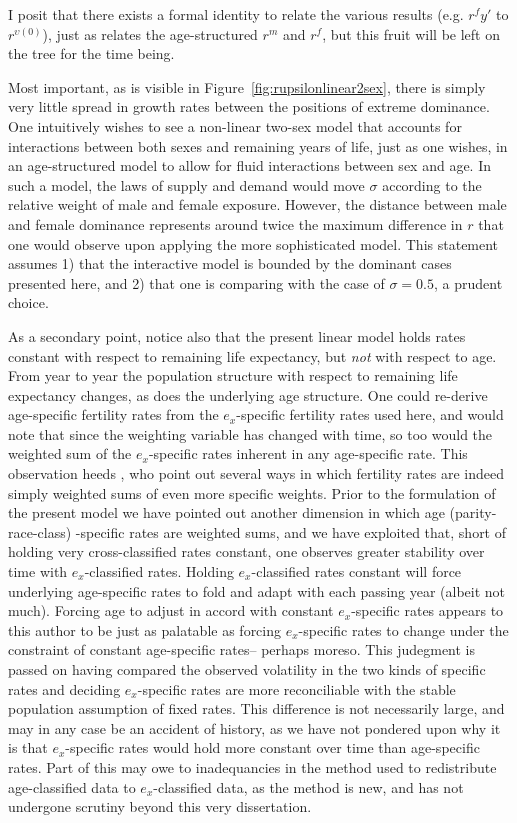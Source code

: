  \FloatBarrier
I posit that there exists a formal identity to relate the various results
(e.g. $r^f{y'}$ to $r^{\upsilon (0)}$), just as \citet[pp. 56]{coale1972growth} relates 
the age-structured $r^m$ and $r^f$, but this fruit will be left on the tree
for the time being.

Most important, as is visible in Figure~\ref{fig:rupsilonlinear2sex}, there is
simply very little spread in growth rates between the positions of extreme
dominance. One intuitively wishes to see a non-linear two-sex model that
accounts for interactions between both sexes and remaining years of life, just
as one wishes, in an age-structured model to allow for fluid interactions
between sex and age. In such a model, the laws of supply and demand would move
$\sigma$ according to the relative weight of male and female exposure. However,
the distance between male and female dominance represents around twice the
maximum difference in $r$ that one would observe upon applying the more
sophisticated model. This statement assumes 1) that the interactive model is
bounded by the dominant cases presented here, and 2) that one is comparing with
the case of $\sigma = 0.5$, a prudent choice. 

As a secondary point, notice also that the present linear model holds rates
constant with respect to remaining life expectancy, but \textit{not} with
respect to age. From year to year the population structure with
respect to remaining life expectancy changes, as does the underlying age
structure. One could re-derive age-specific fertility rates from the
$e_x$-specific fertility rates used here, and would note that since the
weighting variable has changed with time, so too would the weighted sum of
the $e_x$-specific rates inherent in any age-specific rate. This observation
heeds \citet{stolnitz1949recent}, who point out several ways in which
fertility rates are indeed simply weighted sums of even more specific weights.
Prior to the formulation of the present model we have pointed out another
dimension in which age (parity-race-class) -specific rates are weighted sums, and we have exploited
that, short of holding very cross-classified rates constant, one observes
greater stability over time with $e_x$-classified rates. Holding
$e_x$-classified rates constant will force underlying age-specific rates to fold
and adapt with each passing year (albeit not much). Forcing age to adjust in
accord with constant $e_x$-specific rates appears to this author to be just as
palatable as forcing $e_x$-specific rates to change under the constraint of
constant age-specific rates-- perhaps moreso. This judegment is passed on having
compared the observed volatility in the two kinds of specific rates and deciding
$e_x$-specific rates are more reconciliable with the stable population
assumption of fixed rates. This difference is not necessarily large, and may in
any case be an accident of history, as we have not pondered upon why it is that
$e_x$-specific rates would hold more constant over time than age-specific rates.
Part of this may owe to inadequancies in the method used to redistribute
age-classified data to $e_x$-classified data, as the method is new, and has not
undergone scrutiny beyond this very dissertation.